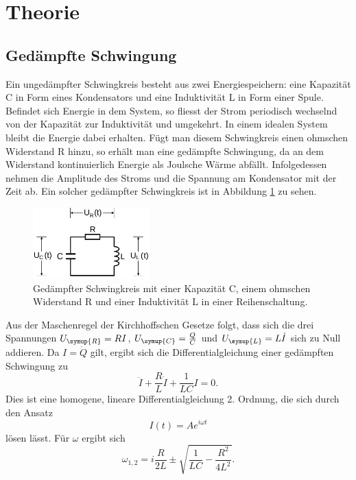 \section{Theorie}
\label{sec:Theorie}
\subsection{Gedämpfte Schwingung}
Ein ungedämpfter Schwingkreis besteht aus zwei Energiespeichern: eine Kapazität C
in Form eines Kondensators und eine Induktivität L in Form einer Spule. Befindet
sich Energie in dem System, so fliesst der Strom periodisch wechselnd von der
Kapazität zur Induktivität und umgekehrt. In einem idealen System bleibt die Energie
dabei erhalten.
Fügt man diesem Schwingkreis einen ohmschen Widerstand R hinzu, so erhält man eine
gedämpfte Schwingung, da an dem Widerstand kontinuierlich Energie als Joulsche Wärme
abfällt. Infolgedessen nehmen die Amplitude des Stroms und die Spannung am
Kondensator mit der Zeit ab. Ein solcher gedämpfter Schwingkreis ist in Abbildung
\ref{fig:gedaempfter_schwingkreis} zu sehen.
\begin{figure}
  \centering
  \includegraphics[width=0.4\textwidth]{gedaempfter_schwingkreis.png}
  \caption{Gedämpfter Schwingkreis mit einer Kapazität C, einem ohmschen Widerstand R
  und einer Induktivität L in einer Reihenschaltung.\cite{sample}}
  \label{fig:gedaempfter_schwingkreis}
\end{figure}
Aus der Maschenregel der Kirchhoffschen Gesetze folgt, dass sich die drei Spannungen
$U_\symup{R} = R I$, $U_\symup{C} = \frac{Q}{C}$ und $U_\symup{L} = L \dot{I}$
sich zu Null addieren. Da $I=\dot{Q}$ gilt, ergibt sich die Differentialgleichung
einer gedämpften Schwingung zu
\begin{equation}
  \ddot{I} + \frac{R}{L}\dot{I} + \frac{1}{L C} I = 0.
  \label{eqn:dgl1}
\end{equation}
Dies ist eine homogene, lineare Differentialgleichung 2. Ordnung, die sich durch
den Ansatz
\begin{equation}
  I(t) = A e^{i \omega t}
  \label{eqn:ansatz}
\end{equation}
lösen lässt. Für $\omega$ ergibt sich
\begin{equation}
  \omega_{1,2} = i \frac{R}{2L}\pm \sqrt{\frac{1}{L C} - \frac{R^2}{4L^2}}.
  \label{eqn:omega12}
\end{equation}
